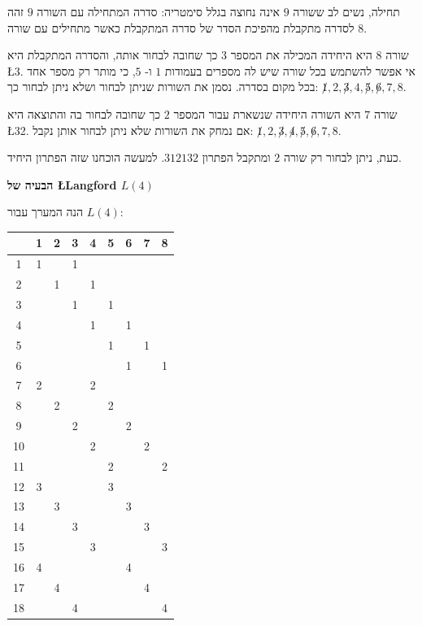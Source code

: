 \documentclass[12pt,a4paper]{article}
\begin{document}
תחילה, נשים לב ששורה
$9$
אינה נחוצה בגלל סימטריה: סדרה המתחילה עם השורה
$9$
זהה לסדרה מתקבלת מהפיכת הסדר של סדרה המתקבלת כאשר מתחילים עם שורה
$8$.

שורה 
$8$
היא היחידה המכילה את המספר
$3$
כך שחובה לבחור אותה, והסדרה המתקבלת היא
\L{3\textvisiblespace \textvisiblespace {}\textvisiblespace}. 
אי אפשר להשתמש בכל שורה שיש לה מספרים בעמודות
$1$
ו-
$5$,
כי מותר רק מספר אחד בכל מקום בסדרה. נסמן את השורות שניתן לבחור ושלא ניתן לבחור כך:
$\not 1,2,\not 3,4,\not 5, \not 6, 7, 8$.

שורה
$7$
היא השורה היחידה שנשארת עבור המספר
$2$
כך שחובה לבחור בה והתוצאה היא
\L{32}.
אם נמחק את השורות שלא ניתן לבחור אותן נקבל:
$\not 1,2,\not 3,\not 4,\not 5, \not 6, 7, 8$.

כעת, ניתן לבחור רק שורה
$2$
ומתקבל הפתרון
$3{}1{}2{}1{}3{}2$.
למעשה הוכחנו שזה הפתרון היחיד.

\begin{center}
\textbf{\Large 
הבעיה של
\L{Langford}
$L(4)$
}
\end{center}

הנה המערך עבור
$L(4)$:
\begin{center}
\begin{tabular}{|c||c|c|c|c|c|c|c|c|}
\hline
&1&2&3&4&5&6&7&8\\\hline\hline
1&1&&1&&&&&\\\hline
2&&1&&1&&&&\\\hline
3&&&1&&1&&&\\\hline
4&&&&1&&1&&\\\hline
5&&&&&1&&1&\\\hline
6&&&&&&1&&1\\\hline
7&2&&&2&&&&\\\hline
8&&2&&&2&&&\\\hline
9&&&2&&&2&&\\\hline
10&&&&2&&&2&\\\hline
11&&&&&2&&&2\\\hline
12&3&&&&3&&&\\\hline
13&&3&&&&3&&\\\hline
14&&&3&&&&3&\\\hline
15&&&&3&&&&3\\\hline
16&4&&&&&4&&\\\hline
17&&4&&&&&4&\\\hline
18&&&4&&&&&4\\\hline
\end{tabular}
\end{center}
\end{document}
